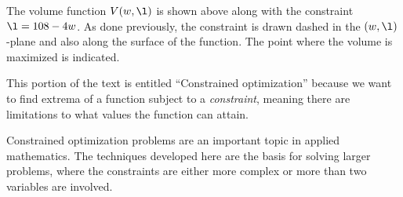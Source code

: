 \documentclass{ximera}
\begin{document}
\begin{example}
\begin{explanation}
\begin{image}
    \end{image}
    The volume function $V(w,\l)$ is shown above
    along with the constraint $\l = 108-4w$. As done previously, the
    constraint is drawn dashed in the $(w,\l)$-plane and also along the
    surface of the function. The point where the volume is maximized
    is indicated.
  \end{explanation}
\end{example}



This portion of the text is entitled ``Constrained optimization''
because we want to find extrema of a function subject to a
\textit{constraint}, meaning there are limitations to what values the
function can attain.

Constrained optimization problems are an important topic in applied
mathematics. The techniques developed here are the basis for solving
larger problems, where the constraints are either more complex or more
than two variables are involved.
\end{document}
